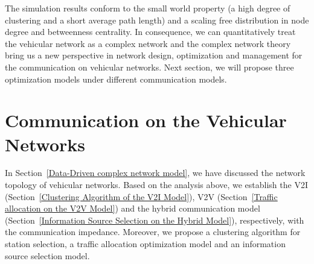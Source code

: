 \documentclass[journal,12pt,draftclsnofoot,onecolumn]{IEEEtran}
\begin{document}
The simulation results conform to the small world property (a high degree of clustering and a short average path length) and a scaling free distribution in node degree and betweenness centrality. In consequence, we can quantitatively treat the vehicular network as a complex network and the complex network theory bring us a new perspective in network design, optimization and management for the communication on vehicular networks. Next section, we will propose three optimization models under different communication models.


\section{Communication on the Vehicular Networks}
\label{The 5G Communication on the VANET}
 In Section~\ref{Data-Driven complex network model}, we have discussed the network topology of vehicular networks. Based on the analysis above, we establish the V2I (Section~\ref{Clustering Algorithm of the V2I Model}), V2V (Section~\ref{Traffic allocation on the V2V Model}) and the hybrid communication model (Section~\ref{Information Source Selection on the Hybrid Model}), respectively, with the communication impedance. Moreover, we propose a clustering algorithm for station selection, a traffic allocation optimization model and an information source selection model.
\end{document}
